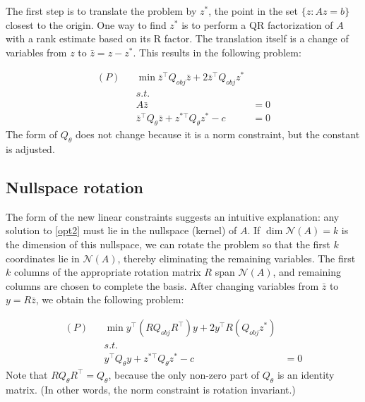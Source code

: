 \documentclass[conference]{IEEEtran}
\begin{document}
The first step is to translate the problem by $z^*$, the point in the set $\{z:Az=b\}$ closest to the origin. One way to find $z^*$ is to perform a QR factorization of $A$ with a rank estimate based on its R factor. The translation itself is a change of variables from $z$ to $\bar{z}=z - z^*$. This results in the following problem:

\begin{subequations}\label{opt2}
\begin{align}
\label{opt2:obj} (P)& & \min \bar{z}^\top Q_{obj}\bar{z} + 2\bar{z}^\top Q_{obj}z^* &\\
\nonumber && s.t.&\\
\label{opt2:lin} && A\bar{z} &= 0 \\
\label{opt2:quad} &&\bar{z}^\top Q_{\theta}\bar{z} + z^{*\top}Q_\theta z^* - c &= 0 
\end{align}
\end{subequations}
The form of $Q_\theta$ does not change because it is a norm constraint, but the constant is adjusted.

\subsection{Nullspace rotation}

The form of the new linear constraints suggests an intuitive explanation: any solution to \eqref{opt2} must lie in the nullspace (kernel) of $A$. If $\dim \mathcal{N}(A) =k$ is the dimension of this nullspace, we can rotate the problem so that the first $k$ coordinates lie in $\mathcal{N}(A)$, thereby eliminating the remaining variables. The first $k$ columns of the appropriate rotation matrix $R$ span $\mathcal{N}(A)$, and remaining columns are chosen to complete the basis. After changing variables from $\bar{z}$ to $y= R\bar{z}$, we obtain the following problem:

\begin{subequations}\label{opt3}
\begin{align}
\label{opt3:obj} (P)& & \min y^\top (RQ_{obj}R^\top) y + 2y^\top R(Q_{obj}z^*) &\\
\nonumber && s.t.&\\
\label{opt3:quad} && y^\top Q_{\theta} y + z^{*\top}Q_\theta z^* - c &= 0
\end{align}
\end{subequations}
Note that $RQ_\theta R^\top = Q_\theta$, because the only non-zero part of $Q_\theta$ is an identity matrix. (In other words, the norm constraint is rotation invariant.)
\end{document}
